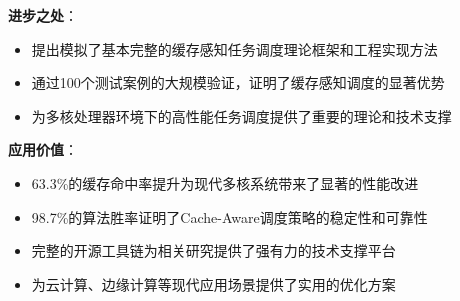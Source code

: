 \begin{tcolorbox}[
    colback=green!5!white,
    colframe=green!50!black,
    title=\textbf{实验验证总结},
    fonttitle=\bfseries,
    arc=3pt
]
\textbf{进步之处}：
\begin{itemize}
    \item 提出模拟了基本完整的缓存感知任务调度理论框架和工程实现方法
    \item 通过100个测试案例的大规模验证，证明了缓存感知调度的显著优势
    \item 为多核处理器环境下的高性能任务调度提供了重要的理论和技术支撑
\end{itemize}

\textbf{应用价值}：
\begin{itemize}
    \item 63.3\%的缓存命中率提升为现代多核系统带来了显著的性能改进
    \item 98.7\%的算法胜率证明了Cache-Aware调度策略的稳定性和可靠性
    \item 完整的开源工具链为相关研究提供了强有力的技术支撑平台
    \item 为云计算、边缘计算等现代应用场景提供了实用的优化方案
\end{itemize}
\end{tcolorbox}
